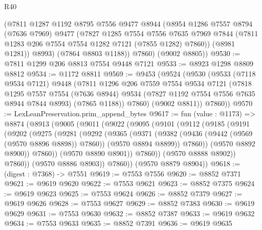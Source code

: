 \begin{lexlean}{R40}
\begin{coremodule}
          (@7811
            @1287
            @1192
            @8795
            @7556
            @9477
            @8944
            (@8954
              @1286
              @7557
              @8794
              (@7636 @7969)
              @9477
              (@7827
                @1285
                @7554
                @7556
                @7635
                @7969
                @7844
                (@7811 @1283 @206 @7554 @7554 @1282 @7121 (@7855 @1282) @7860))
              (@8981 @1281))
            @8993)
          (@7864 @8803 @1188))
        @7860)
      (@9002 @8805))
@9530 := @7811 @1299 @206 @8813 @7554 @9448 @7121
@9533 := @8923 @1298 @8809 @8812
@9534 := @1172 @8811
@9569 := @9453
    (@9524
      (@9530
        (@9533
          (@7118 @9534 @7121)
          @9448
          (@7811
            @1296
            @206
            @7559
            @7554
            @9534
            @7121
            (@7818
              @1295
              @7557
              @7554
              (@7636 @8944)
              @9534
              (@7827 @1192 @7554 @7556 @7635 @8944 @7844 @8993)
              (@7865 @1188))
            @7860)
          (@9002 @8811))
        @7860))
@9570 := LexLeanPreservation.prim_append_bytes
@9617 := fun (value : @1173) =>
  @8874
    (@8913
      (@9005
        (@9011
          (@9022
            (@9095
              (@9101
                (@9112
                  (@9185
                    (@9191
                      (@9202
                        (@9275
                          (@9281
                            (@9292
                              (@9365
                                (@9371
                                  (@9382
                                    (@9436 (@9442 (@9569 (@9570 @8896 @8898)) @7860))
                                    (@9570 @8894 @8899))
                                  @7860))
                              (@9570 @8892 @8900))
                            @7860))
                        (@9570 @8890 @8901))
                      @7860))
                  (@9570 @8888 @8902))
                @7860))
            (@9570 @8886 @8903))
          @7860))
      (@9570 @8879 @8904))
@9618 := (digest : @7368) -> @7551
@9619 := @7553 @7556
@9620 := @8852 @7371
@9621 := @9619 @9620
@9622 := @7553 @9621
@9623 := @8852 @7375
@9624 := @9619 @9623
@9625 := @7553 @9624
@9626 := @8852 @7379
@9627 := @9619 @9626
@9628 := @7553 @9627
@9629 := @8852 @7383
@9630 := @9619 @9629
@9631 := @7553 @9630
@9632 := @8852 @7387
@9633 := @9619 @9632
@9634 := @7553 @9633
@9635 := @8852 @7391
@9636 := @9619 @9635

\end{coremodule}
\end{lexlean}
